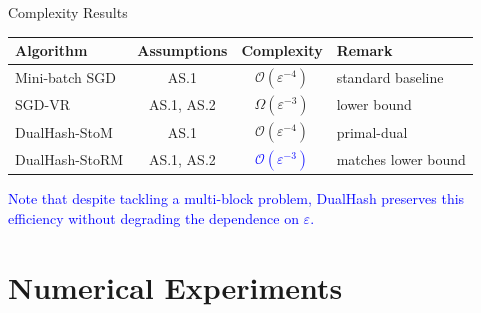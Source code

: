 \documentclass[mathserif,compress,override,9pt]{beamer}
\numberwithin{equation}{section}
\newcommand{\calO}{\mathcal{O}}
\newcommand{\blue}[1]{\textcolor{blue}{#1}}
\theoremstyle{remark}
\begin{document}
\begin{frame}{Complexity Results}
\vspace{0.1cm}

\begin{center}
\begin{tabular}{lccl}
\toprule
\textbf{Algorithm} & \textbf{Assumptions} & \textbf{Complexity} & \textbf{Remark} \\
\midrule
Mini-batch SGD \footnotemark[1] & AS.1 & $\calO(\varepsilon^{-4})$ & standard baseline \\
SGD-VR \footnotemark[2] & AS.1, AS.2 & $\Omega(\varepsilon^{-3})$ & lower bound \\
\midrule
DualHash-StoM & AS.1 & $\calO(\varepsilon^{-4})$ & primal-dual \\
DualHash-StoRM & AS.1, AS.2 & \blue{$\calO(\varepsilon^{-3})$} & matches lower bound \\
\bottomrule
\end{tabular}
\end{center}


\vspace{0.4cm}
\begin{center}
\blue{Note that despite tackling a multi-block problem, DualHash preserves this efficiency \blue{without degrading the dependence on $\varepsilon$}.}
\end{center}
\end{frame}


\section{Numerical Experiments}
\end{document}
